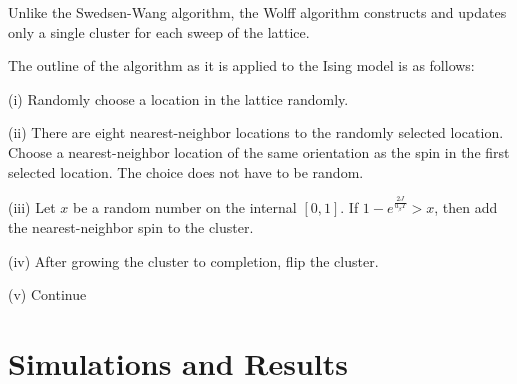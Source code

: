 \documentclass[11pt,letterpaper,fleqn]{article}
\begin{document}
Unlike the Swedsen-Wang algorithm, the Wolff algorithm constructs and updates only a single cluster for each sweep of the lattice.

The outline of the algorithm as it is applied to the Ising model is as follows:
\newline

(i) Randomly choose a location in the lattice randomly.
\newline

(ii) There are eight nearest-neighbor locations to the randomly selected location.  Choose a nearest-neighbor location
of the same orientation as the spin in the first selected location.  The choice does not have to be random.
\newline

(iii) Let $x$ be a random number on the internal $[0,1]$. If $1 - e^{\frac{2J}{u_{\beta}T}} > x$, then add the 
nearest-neighbor spin to the cluster.
\newline

(iv) After growing the cluster to completion, flip the cluster.
\newline

(v) Continue 
\newline


\section*{Simulations and Results}
\end{document}
